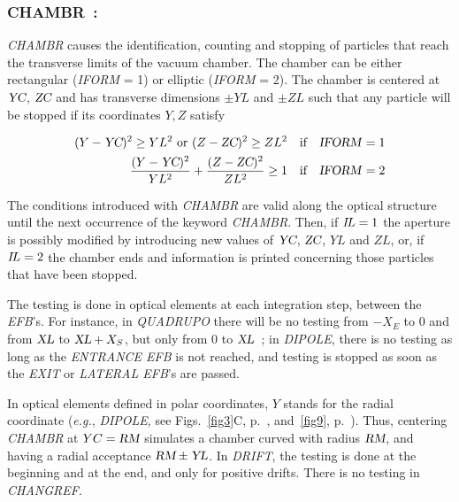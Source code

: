 \newpage

\subsubsection*{CHAMBR~:  \CHAMBRTitl}\label{CHAMBR} 
\medskip

\textsl{CHAMBR} causes the identification, counting and stopping of 
particles that reach the 
transverse limits of the vacuum chamber.  The chamber can be either rectangular 
(\textsl{IFORM} = 1) or elliptic (\textsl{IFORM} = 2). The chamber is centered
at $ \textsl{YC}$, $\textsl{ZC} $ and has transverse dimensions $\pm YL $ and  
$\pm  ZL $ such that any particle will be stopped if its coordinates $ Y,Z $ satisfy 

\begin{align*}
	(Y-\textsl{YC})^2\geq  YL^2  \text{ or }   (Z-\textsl{ZC})^2 \geq  ZL^2 
	   &   \quad \text{if}\quad  \text{\textsl{IFORM}}=1  \\
	\dfrac{ (Y-\textsl{YC})^2 }{ YL^2} + \dfrac{(Z-\textsl{ZC})^2 }{ ZL^2} \geq 1  
	  &   \quad \text{if}\quad  \text{\textsl{IFORM}}=2  
\end{align*}

\noindent The conditions introduced with \textsl{CHAMBR} are valid
along  the optical structure until the next occurrence  of the keyword \textsl{CHAMBR}.  Then, if
$ I\!L=1 $ the aperture is possibly modified by introducing new values of $ \textsl{YC}$,  $ \textsl{ZC}$, 
 $YL $ and $ ZL $, or, if $ I\!L=2 $ the chamber ends and information is 
printed concerning those particles that have been stopped.  
\bigskip

\noindent The testing is done in optical elements at each integration step, between the
\textsl{EFB}'s. For instance, in \textsl{QUADRUPO} there will be 
no testing from $-X_E $ to 0 and 
from $ \textsl{XL} $ to $ \textsl{XL}+X_S $, but only from 0  to $ \textsl{XL} $~;  in \textsl{DIPOLE}, there is no 
testing as long as the \textsl{ENTRANCE EFB} is not reached, and testing is stopped as 
soon as the \textsl{EXIT} or \textsl{LATERAL EFB}'s are passed.  
\bigskip

\noindent In optical elements defined in polar coordinates,  $ Y $  stands for the radial
coordinate (\emph{e.g.}, \textsl{DIPOLE}, see Figs.~\ref{fig3}C, p.~\pageref{fig3}, and~\ref{fig9}, 
p.~\pageref{fig9}).  
 Thus, centering \textsl{CHAMBR} at $ \\YC=\textsl{RM} $ simulates a chamber curved with radius 
 $ \textsl{RM} $, and having a radial acceptance $ \textsl{RM} \pm \textsl{YL} $.  In  \textsl{DRIFT}, the testing  is done 
 at the beginning and at the end, and only for positive drifts.  There 
is no testing in \textsl{CHANGREF}.  
\bigskip

